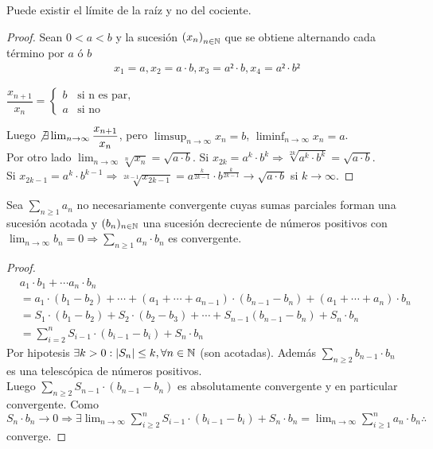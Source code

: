 \begin{eg}
  Puede existir el límite de la raíz y no del cociente.
  \begin{proof}
    Sean \(0 < a < b\) y la sucesión \({(x_n)}_{n \in \mathbb{N}} \) que se obtiene alternando cada término por \(a\) ó \(b\) \begin{align*}
      x_1 = a, x_2 = a \cdot b, x_3 = a² \cdot b, x_4 = a² \cdot b²
    \end{align*}

    \(\dfrac{x_{n+1}}{x_n} = \begin{cases}
        b & \text{si n es par}, \\
        a & \text{si no}
      \end{cases} \)

    Luego \(\not \exists \lim_{n \to \infty} \dfrac{x_{n+1}}{x_n} \), pero \(\limsup_{n \to \infty} x_n = b\), \(\liminf_{n \to \infty} x_n = a\). \\
    Por otro lado \(\lim_{n \to \infty} \sqrt[n]{x_n} = \sqrt{a \cdot b} \). Si \(x_{2k} = a^k \cdot b^k \Rightarrow \sqrt[2k]{a^k \cdot b^k} = \sqrt{a \cdot b} \). \\
    Si \(x_{2k-1} = a^k \cdot b^{k-1} \Rightarrow \sqrt[2k-1]{x_{2k-1}} = a^{\frac{k}{2k-1}} \cdot b^{\frac{k}{2k-1}} \to \sqrt{a \cdot b} \) si \(k \to \infty\).
  \end{proof}
\end{eg}

\begin{theorem}[Dirichlet]
  Sea \(\sum_{n \geq 1} a_n\) no necesariamente convergente cuyas sumas parciales forman una sucesión acotada y \((b_n)_{n \in \mathbb{N}} \) una sucesión decreciente de números positivos con \(\lim_{n \to \infty} b_n = 0 \Rightarrow \sum_{n \geq 1} a_n \cdot b_n\) es convergente.

  \begin{proof}
    \begin{align*}
       & a_1 \cdot b_1 + \cdots a_n \cdot b_n                                                                                \\
       & = a_1 \cdot (b_1 - b_2) +  \cdots + (a_1 + \cdots + a_{n-1}) \cdot (b_{n-1} - b_n) + (a_1 + \cdots + a_n) \cdot b_n \\
       & = S_1 \cdot (b_1 - b_2) + S_2 \cdot (b_2 - b_3) + \cdots + S_{n-1} (b_{n-1} - b_n) + S_n \cdot b_n                  \\
       & = \sum_{i = 2}^n S_{i-1} \cdot (b_{i-1} - b_i) + S_n \cdot b_n
    \end{align*}
    Por hipotesis \(\exists k > 0 : |S_n| \leq k, \forall n \in \mathbb{N} \) (son acotadas). Además \(\sum_{n \geq 2} b_{n-1} \cdot b_n\) es una telescópica de números positivos. \\
    Luego \(\sum_{n \geq 2} S_{n-1} \cdot (b_{n-1} - b_n)\) es absolutamente convergente y en particular convergente.
    Como \(S_n \cdot b_n \to 0 \Rightarrow \exists \lim_{n \to \infty} \sum_{i \geq 2}^n S_{i-1} \cdot (b_{i-1} - b_i) + S_n \cdot b_n = \lim_{n \to \infty} \sum_{i \geq 1}^n a_n \cdot b_n \therefore \) converge.
  \end{proof}
\end{theorem}


